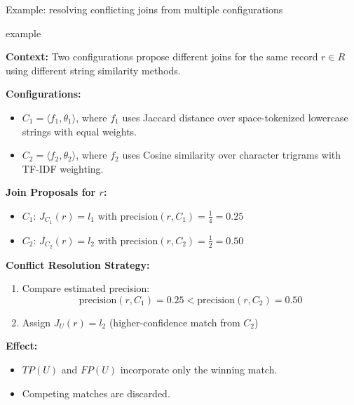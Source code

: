 \documentclass[8pt]{beamer} %
\begin{document}
\begin{frame}{Example: resolving conflicting joins from multiple configurations}
	
	\begin{beamercolorbox}[rounded=true, shadow=true, leftskip=1em, rightskip=1em]{example}		
	
		\textbf{Context:} Two configurations propose different joins for the same record $r \in R$ using different string similarity methods.
		
		\vspace{0.5em}
		\textbf{Configurations:}
		\begin{itemize}
			\item $C_1 = \langle f_1, \theta_1 \rangle$, where $f_1$ uses Jaccard distance over space-tokenized lowercase strings with equal weights.
			\item $C_2 = \langle f_2, \theta_2 \rangle$, where $f_2$ uses Cosine similarity over character trigrams with TF-IDF weighting.
		\end{itemize}
		
		\vspace{0.5em}
		\textbf{Join Proposals for $r$:}
		\begin{itemize}
			\item $C_1$: $J_{C_1}(r) = l_1$ with $\text{precision}(r, C_1) = \frac{1}{4} = 0.25$
			\item $C_2$: $J_{C_2}(r) = l_2$ with $\text{precision}(r, C_2) = \frac{1}{2} = 0.50$
		\end{itemize}
		
		\vspace{0.5em}
		\textbf{Conflict Resolution Strategy:}
		\begin{enumerate}
			\item Compare estimated precision:
			$$
			\text{precision}(r, C_1) = 0.25 < \text{precision}(r, C_2) = 0.50
			$$
			\item Assign $J_U(r) = l_2$ (higher-confidence match from $C_2$)
		\end{enumerate}
		
		\vspace{0.5em}
		\textbf{Effect:}
		\begin{itemize}
			\item $TP(U)$ and $FP(U)$ incorporate only the winning match.
			\item Competing matches are discarded.
		\end{itemize}
	
	\end{beamercolorbox}

\end{frame}
\end{document}
